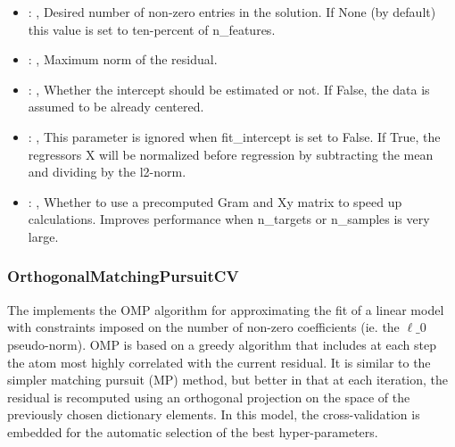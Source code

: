 \begin{itemize}
    \item {}: , 
      Desired number of non-zero entries in the solution. If None (by default)
      this value is set to ten-percent of n\_features.

    \item {}: , 
      Maximum norm of the residual.

    \item {}: , 
      Whether the intercept should be estimated or not. If False,
      the data is assumed to be already centered.

    \item {}: , 
      This parameter is ignored when fit\_intercept is set to False. If True,
      the regressors X will be normalized before regression by subtracting the mean and
      dividing by the l2-norm.

    \item {}: , 
      Whether to use a precomputed Gram and Xy matrix to speed up calculations.
      Improves performance when n\_targets or n\_samples is very large.
  \end{itemize}


\subsubsection{OrthogonalMatchingPursuitCV}
  The                          implements the OMP algorithm for
  approximating the fit of a                         linear model with constraints imposed on the
  number of non-zero                         coefficients (ie. the $\ell\_0$ pseudo-norm). OMP is
  based on a greedy                         algorithm that includes at each step the atom most
  highly correlated                         with the current residual. It is similar to the simpler
  matching                         pursuit (MP) method, but better in that at each iteration, the
  residual                         is recomputed using an orthogonal projection on the space of the
  previously chosen dictionary elements.                         In this model, the cross-validation
  is embedded for the automatic selection                         of the best hyper-parameters.

